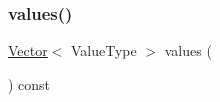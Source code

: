 \mbox{\label{classMap_a50ccbe4184324f0da975648a12728d20}} 
\subsubsection{\texorpdfstring{values()}{values()}}
{\footnotesize\ttfamily \mbox{\hyperlink{classVector}{Vector}}$<$ Value\+Type $>$ values (\begin{DoxyParamCaption}{ }\end{DoxyParamCaption}) const}

